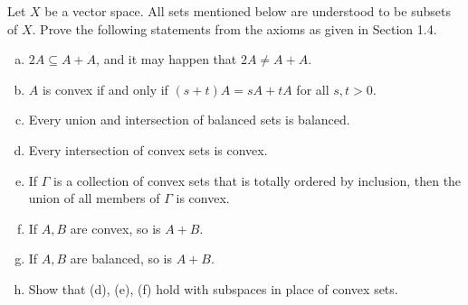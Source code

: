 \begin{exercise}
	Let $X$ be a vector space. All sets mentioned below are understood to be subsets of $X$. Prove the following statements from the axioms as given in Section 1.4.
	\begin{enumerate}[(a)]
		\item $2A \subseteq A+A$, and it may happen that $2A \ne A+A$.
		\item $A$ is convex if and only if $(s+t)A = sA + tA$ for all $s,t>0$.
		\item Every union and intersection of balanced sets is balanced.
		\item Every intersection of convex sets is convex.
		\item If $\Gamma$ is a collection of convex sets that is totally ordered by inclusion, then the union of all members of $\Gamma$ is convex.
		\item If $A, B$ are convex, so is $A+B$.
		\item If $A, B$ are balanced, so is $A+B$.
		\item Show that (d), (e), (f) hold with subspaces in place of convex sets.
	\end{enumerate}
\end{exercise}

